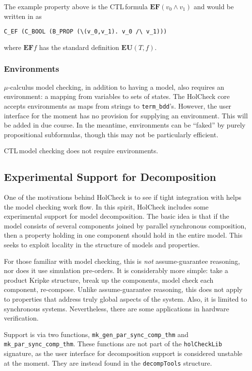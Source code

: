 \documentclass[12pt,fleqn]{article}
\newcommand{\ctl}{\textsf{CTL}\,}
\newcommand{\hc}{HolCheck}
\begin{document}
The example property above is the \ctl formula \( \mathbf{EF} (v_0 \land v_1) \) and would be written in \HOL{} as

\verb+C_EF (C_BOOL (B_PROP (\(v_0,v_1). v_0 /\ v_1)))+

where \(\mathbf{EF} f\) has the standard definition \( \mathbf{EU}(T,f) \).

\subsubsection{Environments}

\(\mu\)-calculus model checking, in addition to having a model, also requires an environment: a mapping from variables to sets of states. The \hc{} core accepts environments as maps from strings to \texttt{term\_bdd}'s. However, the user interface for the moment has no provision for supplying an environment. This will be added in due course. In the meantime, environments can be ``faked'' by purely propositional subformulas, though this may not be particularly efficient.

\ctl model checking does not require environments.

\subsection{Experimental Support for Decomposition}\label{sec:decomp}

One of the motivations behind \hc{} is to see if tight integration with \HOL{} helps the model checking work flow. In this spirit, \hc{}  includes some experimental support for model decomposition. The basic idea is that if the model consists of several components joined by parallel synchronous composition, then a property holding in one component should hold in the entire model. This seeks to exploit locality in the structure of models and properties.

For those familiar with model checking, this is \emph{not} assume-guarantee reasoning, nor does it use simulation pre-orders. It is considerably more simple: take a product Kripke structure, break up the components, model check each component, re-compose. Unlike assume-guarantee reasoning, this does not apply to properties that address truly global aspects of the system. Also, it is limited to synchronous systems. Nevertheless, there are some applications in hardware verification.

Support is via two functions, \texttt{mk\_gen\_par\_sync\_comp\_thm} and \texttt{mk\_par\_sync\_comp\_thm}. These functions are not part of the \texttt{holCheckLib} signature, as the user interface for decomposition support is considered unstable at the moment. They are instead found in the \texttt{decompTools} structure.
\end{document}
